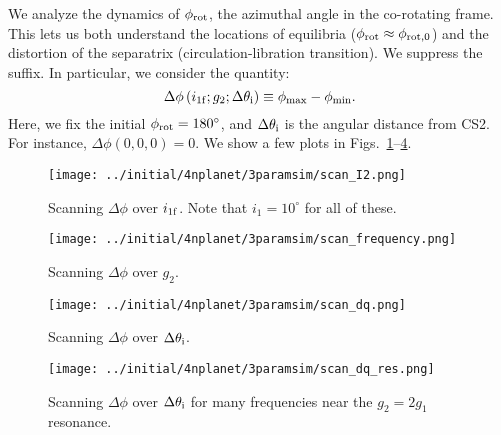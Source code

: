 \documentclass[11pt,
        usenames, %
        dvipsnames %
    ]{article}
\newcommand*{\p}[1]{\left(#1\right)}
\begin{document}
We analyze the dynamics of $\phi_{\rm rot}$, the azimuthal angle in the
co-rotating frame. This lets us both understand the locations of equilibria
($\phi_{\rm rot} \approx \phi_{\rm rot, 0}$) and the distortion of the
separatrix (circulation-libration transition). We suppress the suffix. In
particular, we consider the quantity:
\begin{equation}
    \Delta \phi\p{i_{\rm 1f}; g_2; \Delta \theta_{\rm i}}
        \equiv \phi_{\max} - \phi_{\min}.
\end{equation}
Here, we fix the initial $\phi_{\rm rot} = 180^\circ$, and $\Delta \theta_{\rm
i}$ is the angular distance from CS2. For instance, $\Delta \phi\p{0, 0, 0} =
0$. We show a few plots in Figs.~\ref{fig:scan_I2}--\ref{fig:scan_dq_res}.
\begin{figure}[h]
    \centering
    \texttt{[image: ../initial/4nplanet/3paramsim/scan\_I2.png]}
    \caption{Scanning $\Delta \phi$ over $i_{\rm 1f}$. Note that $i_1 =
    10^\circ$ for all of these.}\label{fig:scan_I2}
\end{figure}
\begin{figure}[h]
    \centering
    \texttt{[image: ../initial/4nplanet/3paramsim/scan\_frequency.png]}
    \caption{Scanning $\Delta \phi$ over $g_2$.}\label{fig:scan_dq_res}
\end{figure}
\begin{figure}[h]
    \centering
    \texttt{[image: ../initial/4nplanet/3paramsim/scan\_dq.png]}
    \caption{Scanning $\Delta \phi$ over $\Delta \theta_{\rm
    i}$.}\label{fig:scan_dq}
\end{figure}
\begin{figure}[h]
    \centering
    \texttt{[image: ../initial/4nplanet/3paramsim/scan\_dq\_res.png]}
    \caption{Scanning $\Delta \phi$ over $\Delta \theta_{\rm
    i}$ for many frequencies near the $g_2 = 2g_1$ resonance.}\label{fig:scan_dq_res}
\end{figure}
\end{document}
